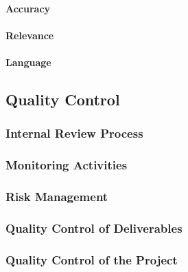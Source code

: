 \documentclass[
  11pt,
]{article}
\begin{document}
\hypertarget{accuracy}{%
\paragraph{Accuracy}\label{accuracy}}

\hypertarget{relevance}{%
\paragraph{Relevance}\label{relevance}}

\hypertarget{language}{%
\paragraph{Language}\label{language}}

\hypertarget{quality-control-1}{%
\subsection{Quality Control}\label{quality-control-1}}

\hypertarget{internal-review-process}{%
\subsubsection{Internal Review Process}\label{internal-review-process}}

\hypertarget{monitoring-activities}{%
\subsubsection{Monitoring Activities}\label{monitoring-activities}}

\hypertarget{risk-management}{%
\subsubsection{Risk Management}\label{risk-management}}

\hypertarget{quality-control-of-deliverables}{%
\subsubsection{Quality Control of
Deliverables}\label{quality-control-of-deliverables}}

\hypertarget{quality-control-of-the-project}{%
\subsubsection{Quality Control of the
Project}\label{quality-control-of-the-project}}
\end{document}
